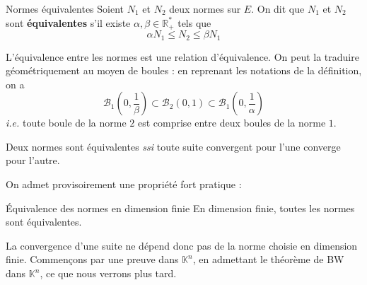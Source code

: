     \begin{defi}{Normes équivalentes}{}
        Soient $N_1$ et $N_2$ deux normes sur $E$. On dit que $N_1$ et $N_2$ sont \textbf{équivalentes} s’il existe $\alpha, \beta \in \mathbb{R}_+^*$ tels que 
        \[ \alpha N_1 \leq N_2 \leq \beta N_1 \]   
    \end{defi}

    L’équivalence entre les normes est une relation d’équivalence. On peut la traduire géométriquement au moyen de boules : en reprenant les notations de la définition, on a 
    \[ \mathcal{B}_1(0,\frac{1}{\beta}) \subset \mathcal{B}_2(0,1) \subset \mathcal{B}_1(0,\frac{1}{\alpha}) \]  
    \textit{i.e.} toute boule de la norme $2$ est comprise entre deux boules de la norme $1$. 

    \begin{prop}{}{}
        Deux normes sont équivalentes \textit{ssi} toute suite convergent pour l’une converge pour l’autre.
    \end{prop}

    On admet provisoirement une propriété fort pratique :

    \begin{theo}{Équivalence des normes en dimension finie}{}
        En dimension finie, toutes les normes sont équivalentes.
    \end{theo}

    La convergence d’une suite ne dépend donc pas de la norme choisie en dimension finie. Commençons par une preuve dans $\mathbb{K}^n$, en admettant le théorème de BW dans $\mathbb{K}^n$, ce que nous verrons plus tard.

